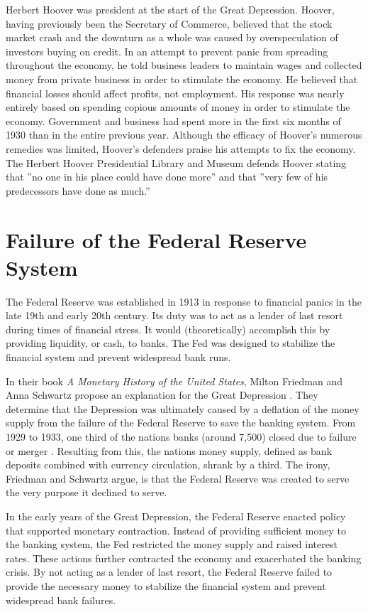 \documentclass[12pt]{article}
\begin{document}
Herbert Hoover was president at the start of the Great Depression. Hoover,
having previously been the Secretary of Commerce, believed that the stock
market crash and the downturn as a whole was caused by overspeculation of
investors buying on credit. In an attempt to prevent panic from spreading
throughout the economy, he told business leaders to maintain wages and
collected money from private business in order to stimulate the economy. He
believed that financial losses should affect profits, not employment. His
response was nearly entirely based on spending copious amounts of money in
order to stimulate the economy. Government and business had spent more in the
first six months of 1930 than in the entire previous year.\autocite{hhplm} 
Although the efficacy of Hoover’s numerous remedies was limited, Hoover’s
defenders praise his attempts to fix the economy. The Herbert Hoover
Presidential Library and Museum defends Hoover stating that ”no one in his
place could have done more” and that ”very few of his predecessors have done as
much.”

\section{Failure of the Federal Reserve System}

The Federal Reserve was established in 1913 in response to financial panics in
the late 19th and early 20th century. Its duty was to act as a lender of last
resort during times of financial stress. It would (theoretically) accomplish
this by providing liquidity, or cash, to banks. The Fed was designed to
stabilize the financial system and prevent widespread bank runs.

In their book \textit{A Monetary History of the United States}, Milton Friedman
and Anna Schwartz propose an explanation for the Great Depression
\autocite{amonetaryhistory}. They determine that the Depression was ultimately
caused by a deflation of the money supply from the failure of the Federal
Reserve to save the banking system. From 1929 to 1933, one third of the nations
banks (around 7,500) closed due to failure or merger \autocite{nber}. Resulting
from this, the nations money supply, defined as bank deposits combined with
currency circulation, shrank by a third. The irony, Friedman and Schwartz
argue, is that the Federal Reserve was created to serve the very purpose it
declined to serve.

In the early years of the Great Depression, the Federal Reserve enacted policy
that supported monetary contraction. Instead of providing sufficient money to
the banking system, the Fed restricted the money supply and raised interest
rates. These actions further contracted the economy and exacerbated the banking
crisis. By not acting as a lender of last resort, the Federal Reserve failed to
provide the necessary money to stabilize the financial system and prevent
widespread bank failures.
\end{document}
